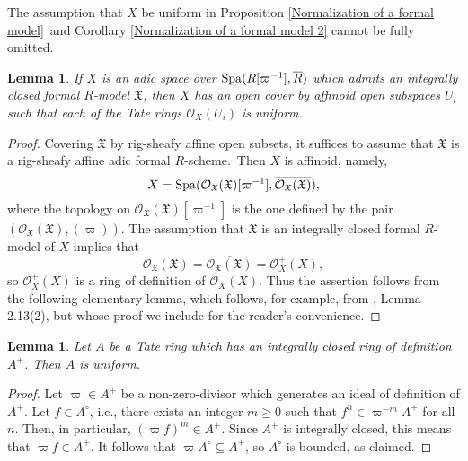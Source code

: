 \documentclass[12pt,twoside,a4paper]{article}
\newtheorem{lemma}[thm]{Lemma}
\theoremstyle{definition}
\theoremstyle{remark}
\newcommand\Spa{{\rm Spa}}
\begin{document}
The assumption that $X$ be uniform in Proposition \ref{Normalization of a formal model} and Corollary \ref{Normalization of a formal model 2} cannot be fully omitted.
\begin{lemma}\label{Integrally closed formal models and uniform adic spaces}If $X$ is an adic space over $\Spa(R[\varpi^{-1}], \overline{R})$ which admits an integrally closed formal $R$-model $\mathfrak{X}$, then $X$ has an open cover by affinoid open subspaces $U_{i}$ such that each of the Tate rings $\mathcal{O}_{X}(U_{i})$ is uniform.\end{lemma}
\begin{proof}Covering $\mathfrak{X}$ by rig-sheafy affine open subsets, it suffices to assume that $\mathfrak{X}$ is a rig-sheafy affine adic formal $R$-scheme. Then $X$ is affinoid, namely, \begin{equation*}X=\Spa(\mathcal{O}_{\mathfrak{X}}(\mathfrak{X})[\varpi^{-1}], \overline{\mathcal{O}_{\mathfrak{X}}(\mathfrak{X})}),\end{equation*}where the topology on $\mathcal{O}_{\mathfrak{X}}(\mathfrak{X})[\varpi^{-1}]$ is the one defined by the pair $(\mathcal{O}_{\mathfrak{X}}(\mathfrak{X}), (\varpi))$. The assumption that $\mathfrak{X}$ is an integrally closed formal $R$-model of $X$ implies that \begin{equation*}\mathcal{O}_{\mathfrak{X}}(\mathfrak{X})=\overline{\mathcal{O}_{\mathfrak{X}}(\mathfrak{X})}=\mathcal{O}_{X}^{+}(X),\end{equation*}so $\mathcal{O}_{X}^{+}(X)$ is a ring of definition of $\mathcal{O}_{X}(X)$. Thus the assertion follows from the following elementary lemma, which follows, for example, from \cite{Nakazato-Shimomoto22}, Lemma 2.13(2), but whose proof we include for the reader's convenience.\end{proof}
\begin{lemma}\label{Power-bounded elements}Let $A$ be a Tate ring which has an integrally closed ring of definition $A^{+}$. Then $A$ is uniform.\end{lemma}
\begin{proof}Let $\varpi\in A^{+}$ be a non-zero-divisor which generates an ideal of definition of $A^{+}$. Let $f\in A^{\circ}$, i.e., there exists an integer $m\geq 0$ such that $f^{n}\in \varpi^{-m}A^{+}$ for all $n$. Then, in particular, $(\varpi f)^{m}\in A^{+}$. Since $A^{+}$ is integrally closed, this means that $\varpi f\in A^{+}$. It follows that $\varpi A^{\circ}\subseteq A^{+}$, so $A^{\circ}$ is bounded, as claimed.\end{proof}
\end{document}
